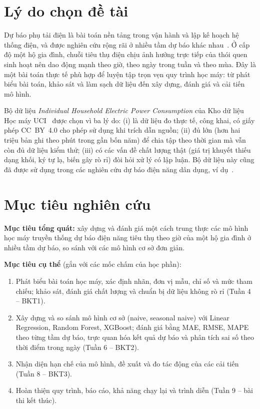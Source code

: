 \documentclass[../main.tex]{subfiles}
\begin{document}
\section*{Lý do chọn đề tài}
Dự báo phụ tải điện là bài toán nền tảng trong vận hành và lập kế hoạch hệ thống điện, và được nghiên cứu rộng rãi ở nhiều tầm dự báo khác nhau~\cite{hong2016probabilistic}. Ở cấp độ một hộ gia đình, chuỗi tiêu thụ điện chịu ảnh hưởng trực tiếp của thói quen sinh hoạt nên dao động mạnh theo giờ, theo ngày trong tuần và theo mùa. Đây là một bài toán thực tế phù hợp để luyện tập trọn vẹn quy trình học máy: từ phát biểu bài toán, khảo sát và làm sạch dữ liệu đến xây dựng, đánh giá và cải tiến mô hình.

Bộ dữ liệu \textit{Individual Household Electric Power Consumption} của Kho dữ liệu Học máy UCI~\cite{hebrail2006uci} được chọn vì ba lý do: (i) là dữ liệu đo thực tế, công khai, có giấy phép CC~BY~4.0 cho phép sử dụng khi trích dẫn nguồn; (ii) đủ lớn (hơn hai triệu bản ghi theo phút trong gần bốn năm) để chia tập theo thời gian mà vẫn còn đủ dữ liệu kiểm thử; (iii) có các vấn đề chất lượng thật (giá trị khuyết thiếu dạng khối, ký tự lạ, biến gây rò rỉ) đòi hỏi xử lý có lập luận. Bộ dữ liệu này cũng đã được sử dụng trong các nghiên cứu dự báo điện năng dân dụng, ví dụ~\cite{kim2019predicting}.

\section*{Mục tiêu nghiên cứu}
\textbf{Mục tiêu tổng quát:} xây dựng và đánh giá một cách trung thực các mô hình học máy truyền thống dự báo điện năng tiêu thụ theo giờ của một hộ gia đình ở nhiều tầm dự báo, so sánh với các mô hình cơ sở đơn giản.

\textbf{Mục tiêu cụ thể} (gắn với các mốc chấm của học phần):
\begin{enumerate}[1.]
    \item Phát biểu bài toán học máy, xác định nhãn, đơn vị mẫu, chỉ số và mức tham chiếu; khảo sát, đánh giá chất lượng và chuẩn bị dữ liệu không rò rỉ (Tuần 4 -- BKT1).
    \item Xây dựng và so sánh mô hình cơ sở (naive, seasonal naive) với Linear Regression, Random Forest, XGBoost; đánh giá bằng MAE, RMSE, MAPE theo từng tầm dự báo, trực quan hóa kết quả dự báo và phân tích sai số theo thời điểm trong ngày (Tuần 6 -- BKT2).
    \item Nhận diện hạn chế của mô hình, đề xuất và đo tác động của các cải tiến (Tuần 8 -- BKT3).
    \item Hoàn thiện quy trình, báo cáo, khả năng chạy lại và trình diễn (Tuần 9 -- bài thi kết thúc).
\end{enumerate}
\end{document}
